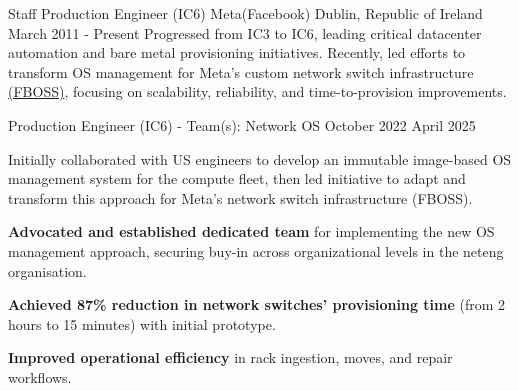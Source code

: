 
\begin{cventries}

  \cventry
  {Staff Production Engineer (IC6)} %
  {Meta(Facebook)} %
  {Dublin, Republic of Ireland} %
  {March 2011 - Present} %
  {
    Progressed from IC3 to IC6, leading critical datacenter automation and bare metal provisioning initiatives. Recently, led efforts to transform OS management for Meta's custom network switch infrastructure \href{https://engineering.fb.com/2015/03/10/data-center-engineering/facebook-open-switching-system-fboss-and-wedge-in-the-open/}{(FBOSS)}, focusing on scalability, reliability, and time-to-provision improvements.
  }
  \vspace{5mm}

  \cventryprevrole
  {Production Engineer (IC6) - Team(s): Network OS}
  {October 2022 \newline April 2025}
  {
    Initially collaborated with US engineers to develop an immutable image-based OS management system for the compute fleet, then led initiative to adapt and transform this approach for Meta's network switch infrastructure (FBOSS).
    \vspace{2mm}
    \begin{cvitems}
      \item \textbf{Advocated and established dedicated team} for implementing the new OS management approach,
      securing buy-in across organizational levels in the neteng organisation.
      \item \textbf{Achieved 87\% reduction in network switches' provisioning time} (from 2 hours to 15 minutes) with initial prototype.
      \item \textbf{Improved operational efficiency} in rack ingestion, moves, and repair workflows.
    \end{cvitems}
  }


\end{cventries}
